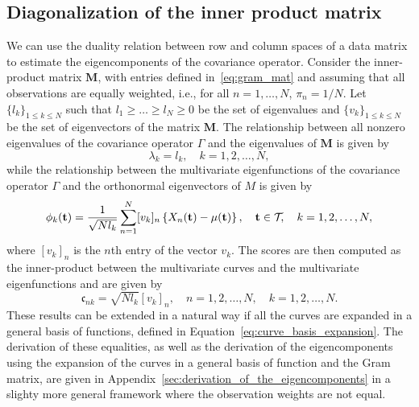 
\subsection{Diagonalization of the inner product matrix} %
\label{sub:by_diagonalization_of_the_inner_product_matrix}

We can use the duality relation between row and column spaces of a data matrix to estimate the eigencomponents of the covariance operator. Consider the inner-product matrix $\mathbf{M}$, with entries defined in~\eqref{eq:gram_mat} and assuming that all observations are equally weighted, i.e., for all $n = 1, \dots, N$, $\pi_n = 1/N$.
Let $\{l_k\}_{1 \leq k \leq N}$ such that $l_1 \geq \dots \geq l_N \geq 0$ be the set of eigenvalues and $\{v_k\}_{1 \leq k \leq N}$ be the set of eigenvectors of the matrix $\mathbf{M}$. The relationship between all nonzero eigenvalues of the covariance operator $\Gamma$ and the eigenvalues of $\mathbf{M}$ is given by
\begin{equation}\label{eq:eigenvalues_relation_p}
    \lambda_k = l_k, \quad k = 1, 2, \dots, N,
\end{equation}
while the relationship between the multivariate eigenfunctions of the covariance operator $\Gamma$ and the orthonormal eigenvectors of $M$ is given by
\begin{equation}\label{eq:eigenfunction_relation_p}
    \phi_k(\mathbf{t}) = \frac{1}{\sqrt{N l_k}}\sum_{n = 1}^N [v_{k}]_n\left\{X_n(\mathbf{t}) - \mu(\mathbf{t})\right\}, \quad \mathbf{t} \in \mathcal{T}_{}, \quad k = 1, 2, \dots, N, 
\end{equation}
where $[v_{k}]_n$ is the $n$th entry of the vector $v_k$. The scores are then computed as the inner-product between the multivariate curves and the multivariate eigenfunctions and are given by
\begin{equation}\label{eq:scores_relation_p}
    \mathfrak{c}_{nk} = \sqrt{N l_k}[v_{k}]_n, \quad n = 1, 2, \dots, N, \quad k = 1, 2, \dots, N. 
\end{equation}
These results can be extended in a natural way if all the curves are expanded in a general basis of functions, defined in Equation~\eqref{eq:curve_basis_expansion}.
The derivation of these equalities, as well as the derivation of the eigencomponents using the expansion of the curves in a general basis of function and the Gram matrix, are given in Appendix~\ref{sec:derivation_of_the_eigencomponents} in a slighty more general framework where the observation weights are not equal.

